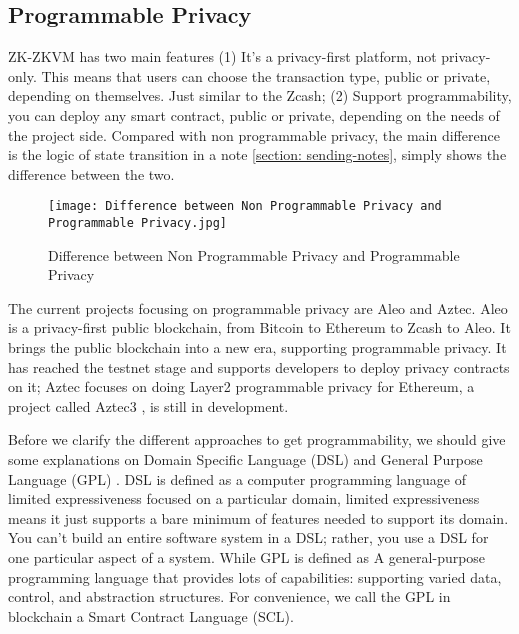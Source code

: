 \subsection{Programmable Privacy}

ZK-ZKVM has two main features (1) It's a privacy-first platform, not privacy-only. This means that users can choose the transaction type, public or private, depending on themselves. Just similar to the Zcash;
(2) Support programmability, you can deploy any smart contract, public or private, depending on the needs of the project side. Compared with non programmable privacy, the main difference is the logic of state transition in a note \ref{section: sending-notes},  simply shows the difference 
between the two.
\begin{figure}[!ht]
    \centering
    \texttt{[image: Difference between Non Programmable Privacy and Programmable Privacy.jpg]}
    \caption{Difference between Non Programmable Privacy and Programmable Privacy}
    \label{fig:Difference between Non Programmable Privacy and Programmable Privacy}
\end{figure}

The current projects focusing on programmable privacy are Aleo \cite{website:Aleo} and Aztec. Aleo is a 
privacy-first public blockchain, from Bitcoin \cite{website:BTC} to Ethereum to Zcash \cite{website:Zcash} to Aleo. It brings the public blockchain into a new era,
supporting programmable privacy. 
It has reached the testnet stage and supports developers to deploy privacy contracts on it; 
Aztec focuses on doing Layer2 programmable privacy for Ethereum, a project 
called Aztec3 \cite{website:Aztec3}, is still in development.

Before we clarify the different approaches to get programmability, we should give some explanations on Domain Specific Language (DSL) and General Purpose Language (GPL) \cite{website:DSL}.
DSL is defined as a computer programming language of limited expressiveness focused on a particular domain, limited expressiveness means it just supports a bare minimum of features 
needed to support its domain. You can't build an entire software system in a DSL; rather, you use a DSL for one particular aspect of a system. While GPL is defined as A general-purpose programming language
that provides lots of capabilities: supporting varied data, control, and abstraction structures. For convenience, we call the GPL in blockchain a Smart Contract Language (SCL).

